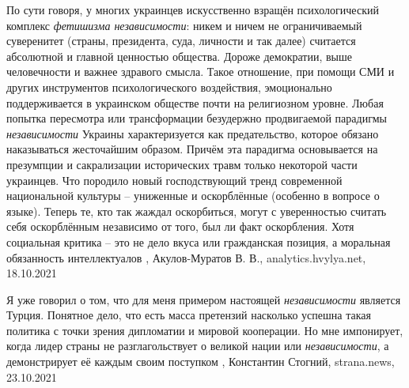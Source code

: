 По сути говоря, у многих украинцев искусственно взращён психологический
комплекс \emph{фетишизма независимости}: никем и ничем не ограничиваемый суверенитет
(страны, президента, суда, личности и так далее) считается абсолютной и главной
ценностью общества. Дороже демократии, выше человечности и важнее здравого
смысла. Такое отношение, при помощи СМИ и других инструментов психологического
воздействия, эмоционально поддерживается в украинском обществе почти на
религиозном уровне. Любая попытка пересмотра или трансформации безудержно
продвигаемой парадигмы \emph{независимости} Украины характеризуется как предательство,
которое обязано наказываться жесточайшим образом.
Причём эта парадигма основывается на презумпции и сакрализации исторических
травм только некоторой части украинцев. Что породило новый господствующий тренд
современной национальной культуры – униженные и оскорблённые (особенно в
вопросе о языке). Теперь те, кто так жаждал оскорбиться, могут с уверенностью
считать себя оскорблённым независимо от того, был ли факт оскорбления. Хотя
социальная критика – это не дело вкуса или гражданская позиция, а моральная
обязанность интеллектуалов
, 
Акулов-Муратов В. В., analytics.hvylya.net, 18.10.2021

Я уже говорил о том, что для меня примером настоящей \emph{независимости} является
Турция. Понятное дело, что есть масса претензий насколько успешна такая
политика с точки зрения дипломатии и мировой кооперации. Но мне импонирует,
когда лидер страны не разглагольствует о великой нации или \emph{независимости}, а
демонстрирует её каждым своим поступком
, 
Константин Стогний, strana.news, 23.10.2021
